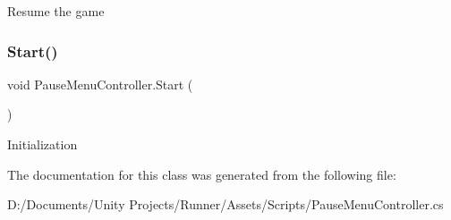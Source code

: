 Resume the game \mbox{\label{class_pause_menu_controller_ad206f4e82b3550eb9a4c22e0a5320126}} 
\subsubsection{\texorpdfstring{Start()}{Start()}}
{\footnotesize\ttfamily void Pause\+Menu\+Controller.\+Start (\begin{DoxyParamCaption}{ }\end{DoxyParamCaption})\hspace{0.3cm}{\ttfamily [private]}}

Initialization 

The documentation for this class was generated from the following file\+:\begin{DoxyCompactItemize}
\item 
D\+:/\+Documents/\+Unity Projects/\+Runner/\+Assets/\+Scripts/Pause\+Menu\+Controller.\+cs\end{DoxyCompactItemize}
